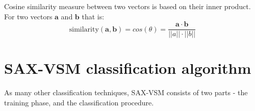 \enlargethispage{0.5cm} 
Cosine similarity measure between two vectors is based on their inner product. 
For two vectors $\mathbf{a}$ and $\mathbf{b}$ that is:
\begin{equation}
\mbox{similarity}(\mathbf{a},\mathbf{b}) = cos(\theta) = \frac{ 
\mathbf{a} \cdot \mathbf{b} } {\left| \left| a \right| \right| \cdot \left| \left| b \right|
\right|}
\end{equation} 

\section{SAX-VSM classification algorithm} \label{sax-vsm}
As many other classification techniques, SAX-VSM consists of two parts - the training
phase, and the classification procedure. 


